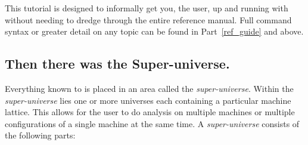 This tutorial is designed to informally get you, the user, up and
running with \tao without needing to dredge through the entire
reference manual. Full command syntax or greater detail on any topic
can be found in Part~\ref{ref_guide} and above.

\subsection{Then there was the Super-universe.}
\label{s:super_universe}

Everything known to \tao is placed in an area called the
\textit{super-universe}. Within the \textit{super-universe} lies one
or more universes each containing a particular machine lattice. This
allows for the user to do analysis on multiple machines or multiple
configurations of a single machine at the same time. A
\textit{super-universe} consists of the following parts:


